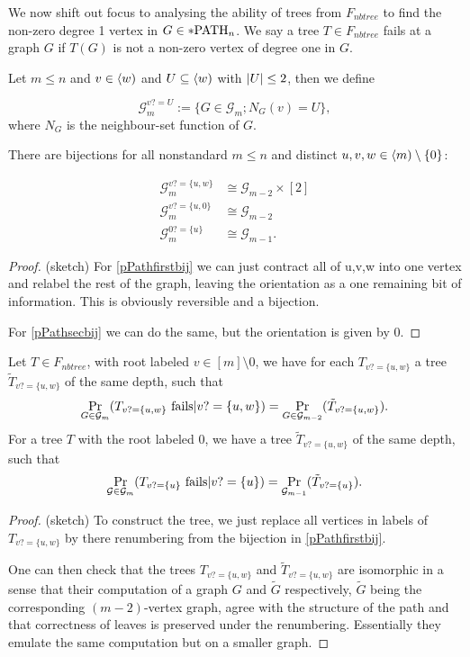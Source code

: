 We now shift out focus to analysing the ability of trees from $F_{nbtree}$ to find the non-zero degree 1 vertex in $G\in *\text{PATH}_n$. We say a tree $T\in F_{nbtree}$ fails at a graph $G$ if $T(G)$ is not a non-zero vertex of degree one in $G$.

\begin{defi}
Let $m\leq n$ and $v\in \langle w)$ and $U\subseteq \langle w)$ with $\left|{U}\right|\leq 2$, then we define 

\[\mathcal{G}_m^{v?=U}:=\{G\in\mathcal{G}_m;N_G(v)=U\},\]
where $N_G$ is the neighbour-set function of $G$.
\end{defi}
\begin{lemm}
There are bijections for all nonstandard $m\leq n$ and distinct $u,v,w\in \langle m)\setminus\{0\}$:

\begin{align}
\mathcal{G}_m^{v?=\{u,w\}}&\cong\mathcal{G}_{m-2}\times [2] \label{pPathfirstbij}\\
\mathcal{G}_m^{v?=\{u,0\}}&\cong\mathcal{G}_{m-2}\label{pPathsecbij}\\
\mathcal{G}_m^{0?=\{u\}}&\cong\mathcal{G}_{m-1}\label{pPaththrdbij}.
\end{align}
\end{lemm}
\begin{proof} (sketch)
For \eqref{pPathfirstbij} we can just contract all of {u,v,w} into one vertex and relabel the rest of the graph, leaving the orientation as a one remaining bit of information. This is obviously reversible and a bijection.

For \eqref{pPathsecbij} we can do the same, but the orientation is given by $0$.
\end{proof}

\begin{lemm}\label{lemmrelabeltree}
Let $T\in F_{nbtree}$, with root labeled $v\in[m]\setminus{0}$, we have for each $T_{v?=\{u,w\}}$ a tree $\tilde T_{v?=\{u,w\}}$ of the same depth, such that
\begin{align}
\Pr_{G\in\mathcal{G}_m}(T_{v?=\{u,w\}}\text{ fails}|v?=\{u,w\})=\Pr_{G\in\mathcal{G}_{m-2}}(\tilde T_{v?=\{u,w\}}).
\end{align}
For a tree $T$ with the root labeled $0$, we have a tree $\tilde T_{v?=\{u,w\}}$ of the same depth, such that
\begin{align}
\Pr_{\mathcal{G}\in\mathcal{G}_m}(T_{v?=\{u\}}\text{ fails}|v?=\{u\})=\Pr_{\mathcal{G}_{m-1}}(\tilde T_{v?=\{u\}}).
\end{align}
\end{lemm}
\begin{proof}(sketch) To construct the tree, we just replace all vertices in labels of $T_{v?=\{u,w\}}$ by there renumbering from the bijection in \eqref{pPathfirstbij}.

One can then check that the trees $T_{v?=\{u,w\}}$ and $\tilde T_{v?=\{u,w\}}$ are isomorphic in a sense that their computation of a graph $G$ and $\tilde G$ respectively, $\tilde G$ being the corresponding $(m-2)$-vertex graph, agree with the structure of the path and that correctness of leaves is preserved under the renumbering. Essentially they emulate the same computation but on a smaller graph.
\end{proof}


